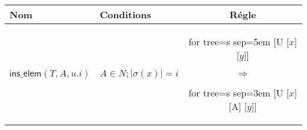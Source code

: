 \begin{table}
	\begin{tabular}{|l|l|c|}
		\hline
		\textbf{Nom} & \textbf{Conditions} & \textbf{Régle} \\
		\hline
		\hline
		$\textsf{ins\_elem}(T, A, u.i)$ & $A \in N; |\sigma(x)| = i$ & \begin{forest}for tree={s sep=5em} [U [$x$] [$y$]]\end{forest} \quad $\Rightarrow$ \quad \begin{forest} for tree={s sep=3em} [U [$x$] [A] [$y$]] \end{forest} \\
		\hline
	\end{tabular}
\end{table}






